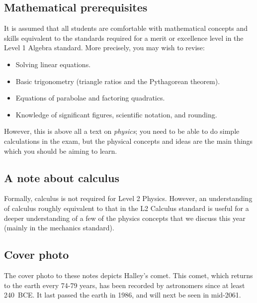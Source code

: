 \documentclass[a4paper]{amsbook}
\begin{document}
\subsection*{Mathematical prerequisites}
It is assumed that all students are comfortable with mathematical concepts and skills equivalent to the standards
required for a merit or excellence level in the Level 1 Algebra standard. More precisely, you may wish to revise:
\begin{itemize}
  \item Solving linear equations.
  \item Basic trigonometry (triangle ratios and the Pythagorean theorem).
  \item Equations of parabolae and factoring quadratics.
  \item Knowledge of significant figures, scientific notation, and rounding.
\end{itemize}

However, this is above all a text on \textit{physics}; you need to be able to do simple calculations in the exam,
but the physical concepts and ideas are the main things which you should be aiming to learn.

\subsection*{A note about calculus}
Formally, calculus is not required for Level 2 Physics. However, an understanding of calculus roughly equivalent
to that in the L2 Calculus standard is useful for a deeper understanding of a few of the physics concepts that
we discuss this year (mainly in the mechanics standard).

\subsection*{Cover photo}
The cover photo to these notes depicts Halley's comet. This comet, which returns to the earth every 74-79 years, has been recorded
by astronomers since at least 240~BCE. It last passed the earth in 1986, and will next be seen in mid-2061.
\end{document}

